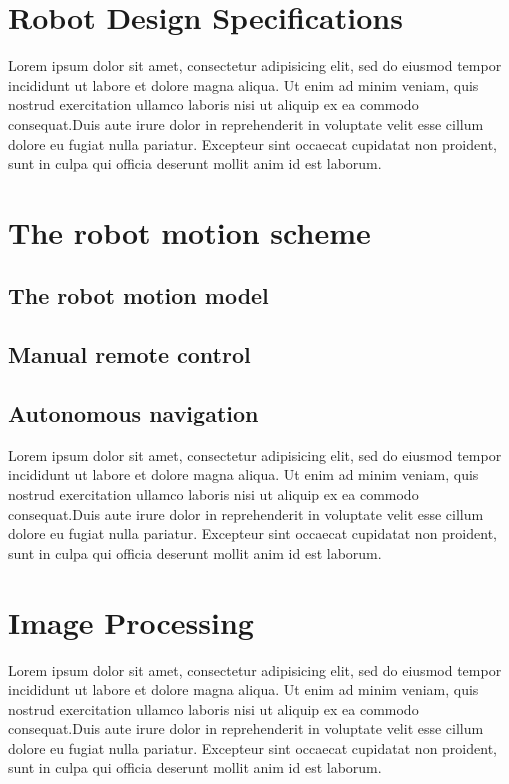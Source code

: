 \documentclass[twocolumn]{article}
\begin{document}
    \section{Robot Design Specifications}
        Lorem ipsum dolor sit amet, consectetur adipisicing elit, sed do eiusmod
        tempor incididunt ut labore et dolore magna aliqua. Ut enim ad minim veniam,
        quis nostrud exercitation ullamco laboris nisi ut aliquip ex ea commodo
        consequat.Duis aute irure dolor in reprehenderit in voluptate velit esse
        cillum dolore eu fugiat nulla pariatur. Excepteur sint occaecat cupidatat non
        proident, sunt in culpa qui officia deserunt mollit anim id est laborum.
    
    \section{The robot motion scheme}
    \subsection{The robot motion model}
    \subsection{Manual remote control}
    \subsection{Autonomous navigation}
        Lorem ipsum dolor sit amet, consectetur adipisicing elit, sed do eiusmod
        tempor incididunt ut labore et dolore magna aliqua. Ut enim ad minim veniam,
        quis nostrud exercitation ullamco laboris nisi ut aliquip ex ea commodo
        consequat.Duis aute irure dolor in reprehenderit in voluptate velit esse
        cillum dolore eu fugiat nulla pariatur. Excepteur sint occaecat cupidatat non
        proident, sunt in culpa qui officia deserunt mollit anim id est laborum.
    
    \section{Image Processing}
        Lorem ipsum dolor sit amet, consectetur adipisicing elit, sed do eiusmod
        tempor incididunt ut labore et dolore magna aliqua. Ut enim ad minim veniam,
        quis nostrud exercitation ullamco laboris nisi ut aliquip ex ea commodo
        consequat.Duis aute irure dolor in reprehenderit in voluptate velit esse
        cillum dolore eu fugiat nulla pariatur. Excepteur sint occaecat cupidatat non
        proident, sunt in culpa qui officia deserunt mollit anim id est laborum.
     
\end{document}
